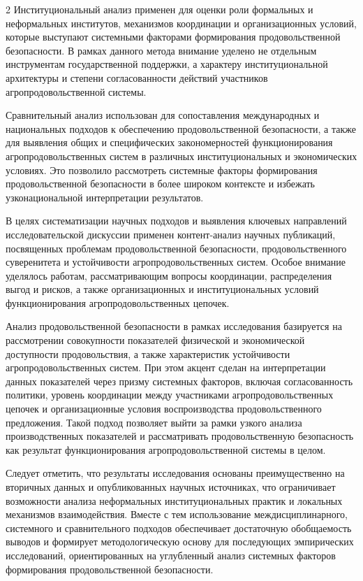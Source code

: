 \begin{multicols}{2}
Институциональный анализ применен для оценки роли формальных и
неформальных институтов, механизмов координации и организационных
условий, которые выступают системными факторами формирования
продовольственной безопасности. В рамках данного метода внимание уделено
не отдельным инструментам государственной поддержки, а характеру
институциональной архитектуры и степени согласованности действий
участников агропродовольственной системы.

Сравнительный анализ использован для сопоставления международных и
национальных подходов к обеспечению продовольственной безопасности, а
также для выявления общих и специфических закономерностей
функционирования агропродовольственных систем в различных
институциональных и экономических условиях. Это позволило рассмотреть
системные факторы формирования продовольственной безопасности в более
широком контексте и избежать узконациональной интерпретации результатов.

В целях систематизации научных подходов и выявления ключевых направлений
исследовательской дискуссии применен контент-анализ научных публикаций,
посвященных проблемам продовольственной безопасности, продовольственного
суверенитета и устойчивости агропродовольственных систем. Особое
внимание уделялось работам, рассматривающим вопросы координации,
распределения выгод и рисков, а также организационных и
институциональных условий функционирования агропродовольственных
цепочек.

Анализ продовольственной безопасности в рамках исследования базируется
на рассмотрении совокупности показателей физической и экономической
доступности продовольствия, а также характеристик устойчивости
агропродовольственных систем. При этом акцент сделан на интерпретации
данных показателей через призму системных факторов, включая
согласованность политики, уровень координации между участниками
агропродовольственных цепочек и организационные условия воспроизводства
продовольственного предложения. Такой подход позволяет выйти за рамки
узкого анализа производственных показателей и рассматривать
продовольственную безопасность как результат функционирования
агропродовольственной системы в целом.

Следует отметить, что результаты исследования основаны преимущественно
на вторичных данных и опубликованных научных источниках, что
ограничивает возможности анализа неформальных институциональных практик
и локальных механизмов взаимодействия. Вместе с тем использование
междисциплинарного, системного и сравнительного подходов обеспечивает
достаточную обобщаемость выводов и формирует методологическую основу для
последующих эмпирических исследований, ориентированных на углубленный
анализ системных факторов формирования продовольственной безопасности.


\end{multicols}
